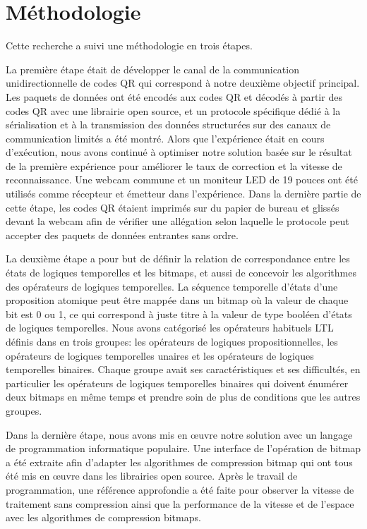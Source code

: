 \section{Méthodologie}

Cette recherche a suivi une méthodologie en trois étapes.

La première étape était de développer le canal de la communication unidirectionnelle de codes QR qui correspond à notre deuxième objectif principal. Les paquets de données ont été encodés aux codes QR et décodés à partir des codes QR avec une librairie open source, et un protocole spécifique dédié à la sérialisation et à la transmission des données structurées sur des canaux de communication limités a été montré. Alors que l'expérience était en cours d'exécution, nous avons continué à optimiser notre solution basée sur le résultat de la première expérience pour améliorer le taux de correction et la vitesse de reconnaissance. Une webcam commune et un moniteur LED de 19 pouces ont été utilisés comme récepteur et émetteur dans l'expérience. Dans la dernière partie de cette étape, les codes QR étaient imprimés sur du papier de bureau et glissés devant la webcam afin de vérifier une allégation selon laquelle le protocole peut accepter des paquets de données entrantes sans ordre.

La deuxième étape a pour but de définir la relation de correspondance entre les états de logiques temporelles et les bitmaps, et aussi de concevoir les algorithmes des opérateurs de logiques temporelles. La séquence temporelle d'états d'une proposition atomique peut être mappée dans un bitmap où la valeur de chaque bit est 0 ou 1, ce qui correspond à juste titre à la valeur de type booléen d'états de logiques temporelles. Nous avons catégorisé les opérateurs habituels LTL définis dans \cite{huth2004} en trois groupes: les opérateurs de logiques propositionnelles, les opérateurs de logiques temporelles unaires et les opérateurs de logiques temporelles binaires. Chaque groupe avait ses caractéristiques et ses difficultés, en particulier les opérateurs de logiques temporelles binaires qui doivent énumérer deux bitmaps en même temps et prendre soin de plus de conditions que les autres groupes.

Dans la dernière étape, nous avons mis en œuvre notre solution avec un langage de programmation informatique populaire. Une interface de l'opération de bitmap a été extraite afin d'adapter les algorithmes de compression bitmap qui ont tous été mis en \oe{}uvre dans les librairies open source. Après le travail de programmation, une référence approfondie a été faite pour observer la vitesse de traitement sans compression ainsi que la performance de la vitesse et de l'espace avec les algorithmes de compression bitmaps.

